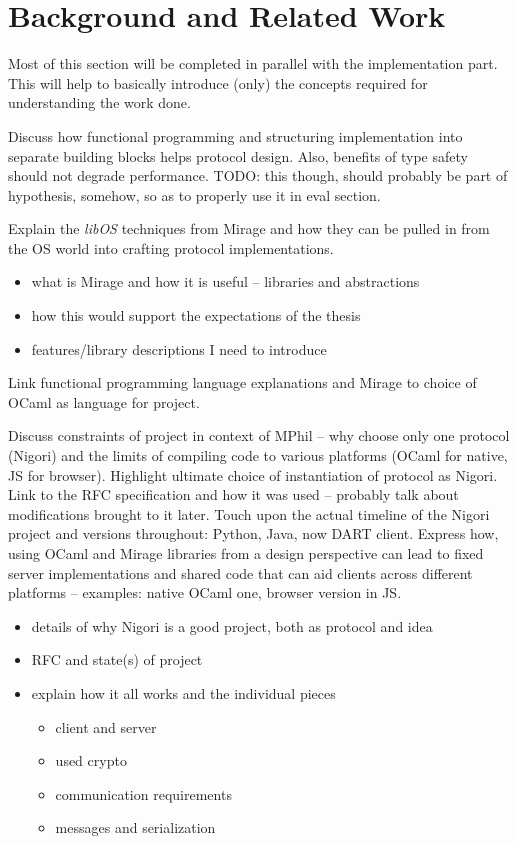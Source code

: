 \chapter{Background and Related Work}

Most of this section will be completed in parallel with the implementation part.
This will help to basically introduce (only) the concepts required for understanding the work done.

Discuss how functional programming and structuring implementation into separate building blocks helps protocol design.
Also, benefits of type safety should not degrade performance. TODO: this though, should probably be part of hypothesis, somehow, so as to properly use it in eval section.

Explain the \textit{libOS} techniques from Mirage and how they can be pulled in from the OS world into crafting protocol implementations.
\begin{itemize}
  \item what is Mirage and how it is useful -- libraries and abstractions
  \item how this would support the expectations of the thesis
  \item features/library descriptions I need to introduce
\end{itemize}
Link functional programming language explanations and Mirage to choice of OCaml as language for project.

Discuss constraints of project in context of MPhil -- why choose only one protocol (Nigori) and the limits of compiling code to various platforms (OCaml for native, JS for browser).
Highlight ultimate choice of instantiation of protocol as Nigori.
Link to the RFC specification and how it was used -- probably talk about modifications brought to it later.
Touch upon the actual timeline of the Nigori project and versions throughout: Python, Java, now DART client.
Express how, using OCaml and Mirage libraries from a design perspective can lead to fixed server implementations and shared code that can aid clients across different platforms -- examples: native OCaml one, browser version in JS.

\begin{itemize}
  \item details of why Nigori is a good project, both as protocol and idea
  \item RFC and state(s) of project
  \item explain how it all works and the individual pieces
  \begin{itemize}
    \item client and server
    \item used crypto
    \item communication requirements
    \item messages and serialization
  \end{itemize}
\end{itemize}
